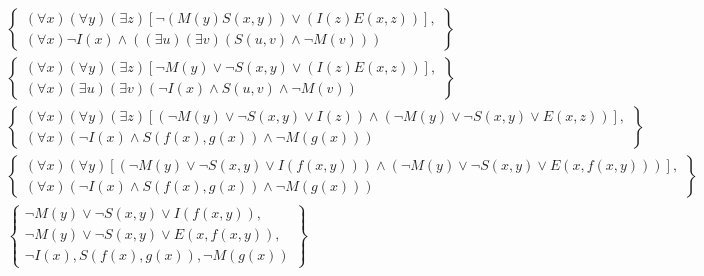\documentclass[12pt]{article}
\begin{document}
\begin{gather*}
  \left\{
    \begin{array}{c}
      \left(\forall x\right)\left(\forall y\right)\left(\exists z\right)\left[\neg\left(M(y)S(x,y)\right) \vee \left(I(z)E(x,z)\right)\right], \\
      \left(\forall x\right)\neg I(x)\wedge \left(\left(\exists u\right)\left(\exists v\right)\left(S(u, v) \wedge \neg M(v)\right)\right)
    \end{array}
  \right\} \\
  \left\{
    \begin{array}{c}
      \left(\forall x\right)\left(\forall y\right)\left(\exists z\right)\left[\neg M(y) \vee \neg S(x,y) \vee \left(I(z)E(x,z)\right)\right], \\
      \left(\forall x\right)\left(\exists u\right)\left(\exists v\right)\left(\neg I(x)\wedge S(u, v) \wedge \neg M(v)\right)
    \end{array}
  \right\} \\
  \left\{
    \begin{array}{c}
      \left(\forall x\right)\left(\forall y\right)\left(\exists z\right)\left[\left(\neg M(y) \vee \neg S(x,y) \vee I(z)\right) \wedge \left(\neg M(y) \vee \neg S(x,y) \vee E(x,z)\right)\right], \\
      \left(\forall x\right)\left(\neg I(x)\wedge S(f(x), g(x)) \wedge \neg M(g(x))\right)
    \end{array}
  \right\} \\
  \left\{
    \begin{array}{c}
      \left(\forall x\right)\left(\forall y\right)\left[\left(\neg M(y) \vee \neg S(x,y) \vee I(f(x, y))\right) \wedge \left(\neg M(y) \vee \neg S(x,y) \vee E(x,f(x, y))\right)\right], \\
      \left(\forall x\right)\left(\neg I(x)\wedge S(f(x), g(x)) \wedge \neg M(g(x))\right)
    \end{array}
  \right\} \\
  \left\{
    \begin{array}{c}
      \neg M(y) \vee \neg S(x,y) \vee I(f(x,y)), \\
      \neg M(y) \vee \neg S(x,y) \vee E(x,f(x,y)), \\
      \neg I(x), S(f(x), g(x)), \neg M(g(x))
    \end{array}
  \right\} \\
\end{gather*}
\end{document}
